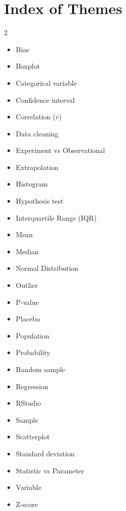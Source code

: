 \documentclass[11pt,openany]{book}
\begin{document}
\chapter*{Index of Themes}
\begin{multicols}{2}
\begin{itemize}
    \item Bias
    \item Boxplot
    \item Categorical variable
    \item Confidence interval
    \item Correlation ($r$)
    \item Data cleaning
    \item Experiment vs Observational
    \item Extrapolation
    \item Histogram
    \item Hypothesis test
    \item Interquartile Range (IQR)
    \item Mean
    \item Median
    \item Normal Distribution
    \item Outlier
    \item P-value
    \item Placebo
    \item Population
    \item Probability
    \item Random sample
    \item Regression
    \item RStudio
    \item Sample
    \item Scatterplot
    \item Standard deviation
    \item Statistic vs Parameter
    \item Variable
    \item Z-score
\end{itemize}
\end{multicols}
\end{document}
